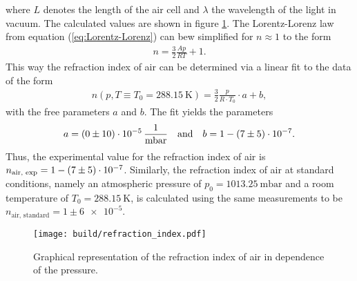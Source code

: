 where $L$ denotes the length of the air cell and $\lambda$ the wavelength of the light in vacuum.
The calculated values are shown in figure \ref{fig:refraction_index}.
The Lorentz-Lorenz law from equation (\ref{eq:Lorentz-Lorenz}) can bew simplified for $n\approx1$ to the form
\begin{align}
    n = \frac 32 \frac{Ap}{RT}+1.
\end{align}
This way the refraction index of air can be determined via a linear fit to the data of the form
\begin{align}
    n(p, T\equiv T_0=\SI{288.15}{\kelvin}) = \frac 32 \frac{p}{R\cdot T_0}\cdot a + b,
\end{align}
with the free parameters $a$ and $b$.
The fit yields the parameters
\begin{align*}
    a = \SI{0\pm 10e-5}{\per\milli\bar} \quad \text{and} \quad b = 1 - \num{7\pm5e-7}.
\end{align*}
Thus, the experimental value for the refraction index of air is $n_{\text{air, exp}}=1-\num{7\pm5e-7}$.
Similarly, the refraction index of air at standard conditions, namely an atmospheric pressure of $p_0=\SI{1013.25}{\milli\bar}$ and a room temperature of $T_0=\SI{288.15}{\kelvin}$, is calculated using the same measurements to be $n_{\text{air, standard}}=1\pm\num{6e-5}$.
\begin{figure}[H]
    \centering
    \texttt{[image: build/refraction\_index.pdf]}
    \caption{Graphical representation of the refraction index of air in dependence of the pressure.}
    \label{fig:refraction_index}
\end{figure}